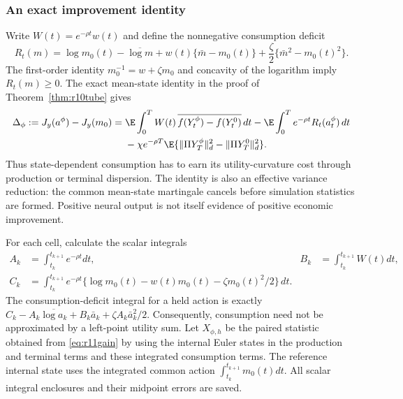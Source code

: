 \subsubsection{An exact improvement identity}
Write $W(t)=e^{-\rho t}w(t)$ and define the nonnegative consumption deficit
\begin{equation}\label{eq:r11deficit}
 R_t(m)=\log m_0(t)-\overline{\log m}
       +w(t)\{\bar m-m_0(t)\}
       +\frac\zeta2\{\bar m^2-m_0(t)^2\}.
\end{equation}
The first-order identity $m_0^{-1}=w+\zeta m_0$ and concavity of the logarithm imply $R_t(m)\geq0$. The exact mean-state identity in the proof of Theorem~\ref{thm:r10tube} gives
\begin{align}
 \Delta_\phi:=J_y(a^\phi)-J_y(m_0)
 ={}&\E\int_0^T W(t)\,\overline{f(Y^\phi_t)-f(Y^0_t)}\,dt
       -\E\int_0^T e^{-\rho t}R_t(a^\phi_t)\,dt\notag\\
 &-\chi e^{-\rho T}\E\{\|\Pi Y^\phi_T\|_d^2-\|\Pi Y^0_T\|_d^2\}.
 \label{eq:r11gain}
\end{align}
Thus state-dependent consumption has to earn its utility-curvature cost through production or terminal dispersion. The identity is also an effective variance reduction: the common mean-state martingale cancels before simulation statistics are formed. Positive neural output is not itself evidence of positive economic improvement.

For each cell, calculate the scalar integrals
\begin{align*}
 A_k&=\int_{t_k}^{t_{k+1}}e^{-\rho t}dt,&
 B_k&=\int_{t_k}^{t_{k+1}}W(t)dt,\\
 C_k&=\int_{t_k}^{t_{k+1}}e^{-\rho t}
       \{\log m_0(t)-w(t)m_0(t)-\zeta m_0(t)^2/2\}\,dt.
\end{align*}
The consumption-deficit integral for a held action is exactly
$C_k-A_k\overline{\log a_k}+B_k\bar a_k+\zeta A_k\bar a_k^2/2$.
Consequently, consumption need not be approximated by a left-point utility sum. Let $X_{\phi,h}$ be the paired statistic obtained from \eqref{eq:r11gain} by using the internal Euler states in the production and terminal terms and these integrated consumption terms. The reference internal state uses the integrated common action $\int_{t_k}^{t_{k+1}}m_0(t)dt$. All scalar integral enclosures and their midpoint errors are saved.


